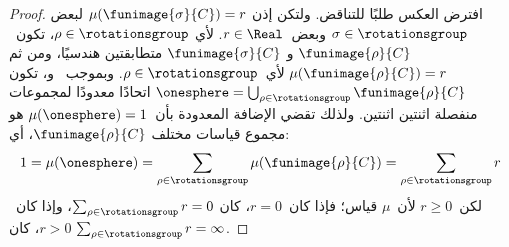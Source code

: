 \documentclass[../../../include/open-logic-section]{subfiles}
\begin{document}
\begin{proof}
افترض العكس طلبًا للتناقض. ولتكن إذن
$\mu(\funimage{\sigma}{C}) = r$ لبعض
$\sigma \in \rotationsgroup$ وبعض~$r \in \Real$. لأي
$\rho \in \rotationsgroup$، تكون~$\funimage{\rho}{C}$ و
$\funimage{\sigma}{C}$ متطابقتين هندسيًا، ومن ثم
$\mu(\funimage{\rho}{C}) = r$ لأي~$\rho \in \rotationsgroup$.
وبموجب~ و، تكون
$\onesphere =
\bigcup_{\rho \in \rotationsgroup}\funimage{\rho}{C}$ اتحادًا
معدودًا لمجموعات منفصلة اثنتين اثنتين. ولذلك تقضي الإضافة المعدودة
بأن~$\mu(\onesphere) = 1$ هو مجموع قياسات مختلف
$\funimage{\rho}{C}$، أي:
\[
	1 = \mu(\onesphere) = \sum_{\rho \in \rotationsgroup}\mu(\funimage{\rho}{C}) = \sum_{\rho \in \rotationsgroup}r
\]
لكن~$r \geq 0$ لأن~$\mu$ قياس؛ فإذا كان~$r = 0$، كان
$\sum_{\rho \in \rotationsgroup}r = 0$، وإذا كان~$r > 0$، كان
$\sum_{\rho \in \rotationsgroup}r = \infty$.
\end{proof}
\end{document}

